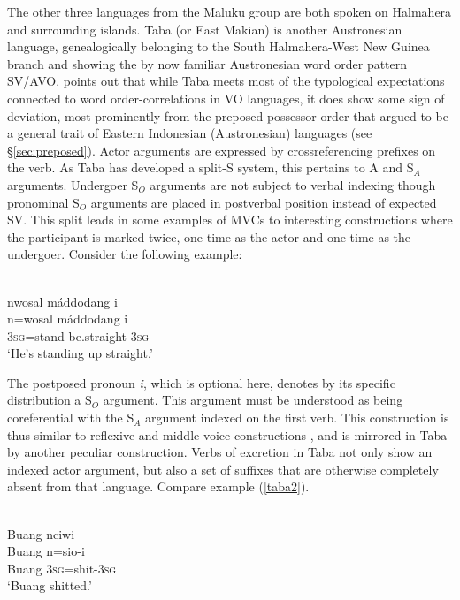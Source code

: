 The other three languages from the Maluku group are both spoken on Halmahera and surrounding islands. Taba (or East Makian) is another Austronesian language, genealogically belonging to the South Halmahera-West New Guinea branch and showing the by now familiar Austronesian word order pattern SV/AVO. \citet[144f.]{bowden2001taba} points out that while Taba meets most of the typological expectations connected to word order-correlations in VO languages, it does show some sign of deviation, most prominently from the preposed possessor order that \citet{Himmelmann2005austronesian} argued to be a general trait of Eastern Indonesian (Austronesian) languages (see §\ref{sec:preposed}). Actor arguments are expressed by crossreferencing prefixes on the verb. As Taba has developed a split-S system, this pertains to A and S$_A$ arguments. Undergoer S$_O$ arguments are not subject to verbal indexing though pronominal S$_O$ arguments are placed in postverbal position instead of expected SV. This split leads in some examples of MVCs to interesting constructions where the participant is marked twice, one time as the actor and one time as the undergoer. Consider the following example:

\ea \label{taba1}
\\
\glll nwosal máddodang i \\
n=wosal máddodang i \\
\textsc{3}\textsc{sg}=stand be.straight \textsc{3}\textsc{sg} \\
\glft `He's standing up straight.'  
\z

The postposed pronoun \textit{i}, which is optional here, denotes by its specific distribution a S$_O$ argument. This argument must be understood as being coreferential with the S$_A$ argument indexed on the first verb. This construction is thus similar to reflexive and middle voice constructions \citep[301]{bowden2001taba}, and is mirrored in Taba by another peculiar construction. Verbs of excretion in Taba not only show an indexed actor argument, but also a set of suffixes that are otherwise completely absent from that language. Compare example (\ref{taba2}).

\ea \label{taba2}
\\
\glll Buang nciwi \\
Buang n=sio-i \\
Buang \textsc{3}\textsc{sg}=shit-\textsc{3}\textsc{sg} \\
\glft `Buang shitted.' 
\z

